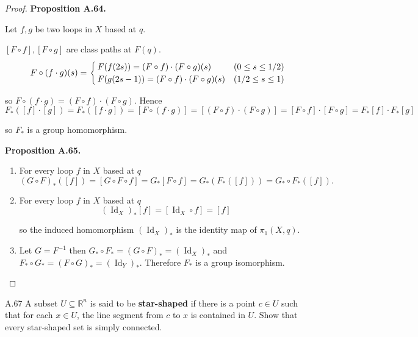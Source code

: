 \begin{proof}
    \textbf{Proposition A.64.}

    Let \( f, g \) be two loops in \( X \) based at \( q \).

    \( [F \circ f], [F \circ g] \) are class paths at \( F(q) \).
    \[
        F \circ (f \cdot g)(s) = \begin{cases}
            F(f(2s)) = (F \circ f) \cdot (F \circ g)(s)     & (0 \le s \le 1/2) \\
            F(g(2s - 1)) = (F \circ f) \cdot (F \circ g)(s) & (1/2 \le s \le 1)
        \end{cases} \\
    \]

    so \( F \circ (f \cdot g) = (F \circ f) \cdot (F \circ g) \). Hence
    \[
        F_{\ast}([f] \cdot [g]) = F_{\ast}([f \cdot g]) = [F \circ (f \cdot g)] = [(F \circ f) \cdot (F \circ g)] = [F \circ f] \cdot [F \circ g] = F_{\ast}[f] \cdot F_{\ast}[g]
    \]

    so \( F_{\ast} \) is a group homomorphism.

    \textbf{Proposition A.65.}

    \begin{enumerate}[itemsep=0pt,label={(\alph*)}]
        \item For every loop \( f \) in \( X \) based at \( q \)
              \[
                  {(G \circ F)}_{\ast}([f]) = [G \circ F \circ f] = G_{\ast}[F \circ f] = G_{\ast}(F_{\ast}([f])) = G_{\ast} \circ F_{\ast}([f]).
              \]
        \item For every loop \( f \) in \( X \) based at \( q \)
              \[
                  {(\operatorname{Id}_{X})}_{\ast}[f] = [\operatorname{Id}_{X} \circ f] = [f]
              \]

              so the induced homomorphism \( {(\operatorname{Id}_{X})}_{\ast} \) is the identity map of \( \pi_{1}(X, q) \).
        \item Let \( G = F^{-1} \) then \( G_{\ast} \circ F_{\ast} = {(G \circ F)}_{\ast} = {(\operatorname{Id}_{X})}_{\ast} \) and \( F_{\ast} \circ G_{\ast} = {(F \circ G)}_{\ast} = {(\operatorname{Id}_{Y})}_{\ast} \). Therefore \( F_{\ast} \) is a group isomorphism.
    \end{enumerate}
\end{proof}

\begin{exercise}{A.67}
    A subset \( U \subseteq \mathbb{R}^{n} \) is said to be \textbf{star-shaped} if there is a point \( c \in U \) such that for each \( x \in U \), the line segment from \( c \) to \( x \) is contained in \( U \). Show that every star-shaped set is simply connected.
\end{exercise}

